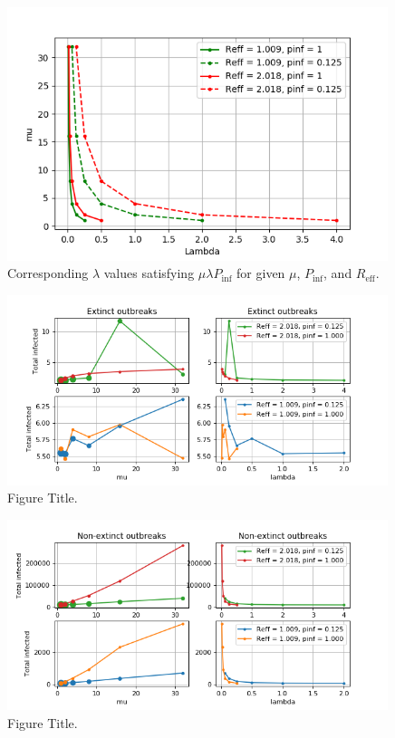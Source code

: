 \documentclass[sr]{drdc-report}
\def\Reff{\ensuremath{R_\mathrm{eff}}}
\def\Pinf{\ensuremath{P_\mathrm{inf}}}
\begin{document}
\begin{figure}
  \includegraphics[width=0.99\textwidth, keepaspectratio=true]{figures/plt_muvslambda}
  \caption{Corresponding $\lambda$ values satisfying $\mu\lambda\Pinf$ for given $\mu$, \Pinf, and \Reff.}\label{fig_plt_muvslambda}
\end{figure}




\begin{figure}
  \includegraphics[width=0.99\textwidth, keepaspectratio=true]{figures/NinfExt_exp1}
  \caption{Figure Title.}\label{fig_plt_NinfExtExp1}
\end{figure}

\begin{figure}
  \includegraphics[width=0.99\textwidth, keepaspectratio=true]{figures/NinfOut_exp1}
  \caption{Figure Title.}\label{fig_plt_NinfOutExp1}
\end{figure}
\end{document}

